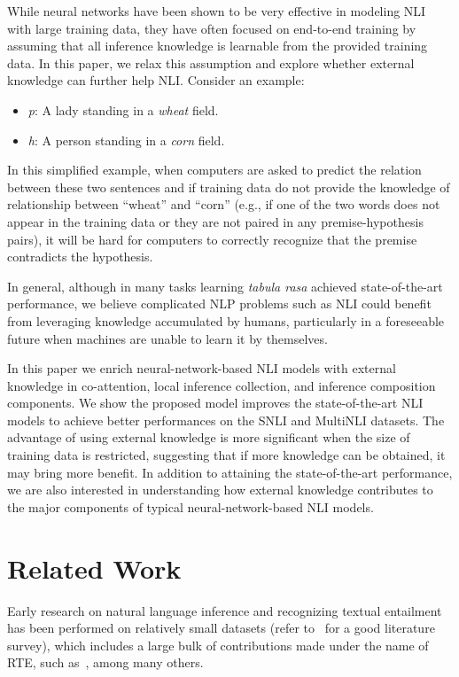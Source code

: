 \documentclass[11pt,a4paper]{article}
\begin{document}
While neural networks have been shown to be very effective in modeling NLI with large training data, they have often focused on end-to-end training by assuming that  all inference knowledge is learnable from the provided training data. In this paper, we relax this assumption and explore whether external knowledge can further help NLI. Consider an example:
\begin{itemize}
\itemsep 0em
\item \textit{p}: A lady standing in a \textit{wheat} field.	
\item \textit{h}: A person standing in a \textit{corn} field. 
\end{itemize}
In this simplified example, when computers are asked to predict the relation between these two sentences and if training data do not provide the knowledge of relationship between ``wheat'' and ``corn'' (e.g., if one of the two words does not appear in the training data or they are not paired in any premise-hypothesis pairs), it will be hard for computers to correctly recognize that the premise contradicts the hypothesis. 

In general, although in many tasks learning \textit{tabula rasa} achieved state-of-the-art performance, we believe complicated NLP problems such as NLI could benefit from leveraging knowledge accumulated by humans, particularly in a foreseeable future when machines are unable to learn it by themselves. 

In this paper we enrich neural-network-based NLI models with external knowledge in co-attention, local inference collection, and inference composition components. We show the proposed model improves the state-of-the-art NLI models to achieve better performances on the SNLI and MultiNLI datasets. The advantage of using external knowledge is more significant when the size of training data is restricted, suggesting that if more knowledge can be obtained, it may bring more benefit. In addition to attaining the state-of-the-art performance, we are also interested in understanding how external knowledge contributes to the major components of typical neural-network-based NLI models. 

\section{Related Work}
\label{sec:related}
Early research on natural language inference and recognizing textual entailment has been performed on relatively small datasets (refer to~\citet{MacCartneyThesis} for a good literature survey), which includes a large bulk of contributions made under the name of RTE, such as~\citep{Dagan2005ThePR,Iftene:W07-1421}, among many others.   
\end{document}
